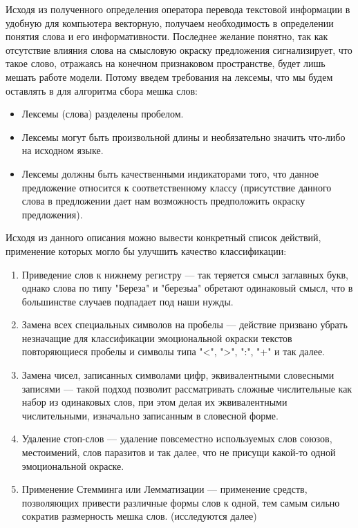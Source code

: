 \documentclass{article}
\begin{document}
    Исходя из полученного определения оператора перевода текстовой информации в удобную для компьютера векторную, получаем необходимость в определении понятия слова и его информативности. Последнее желание понятно, так как отсутствие влияния слова на смысловую окраску предложения сигнализирует, что такое слово, отражаясь на конечном признаковом пространстве, будет лишь мешать работе модели. Потому введем требования на лексемы, что мы будем оставлять в для алгоритма сбора мешка слов:

    \begin{itemize}
        \item Лексемы (слова) разделены пробелом.
        \item Лексемы могут быть произвольной длины и необязательно значить что-либо на исходном языке.
        \item Лексемы должны быть качественными индикаторами того, что данное предложение относится к соответственному классу (присутствие данного слова в предложении дает нам возможность предположить окраску предложения).
    \end{itemize}

    \noindent Исходя из данного описания можно вывести конкретный список действий, применение которых могло бы улучшить качество классификации:

    \begin{enumerate}
        \item Приведение слов к нижнему регистру — так теряется смысл заглавных букв, однако слова по типу "Береза" и "березыа" обретают одинаковый смысл, что в большинстве случаев подпадает под наши нужды.
        \item Замена всех специальных символов на пробелы — действие призвано убрать незначащие для классификации эмоциональной окраски текстов повторяющиеся пробелы и символы типа "<", ">", ":", "+" и так далее.
        \item Замена чисел, записанных символами цифр, эквивалентными словесными записями — такой подход позволит рассматривать сложные числительные как набор из одинаковых слов, при этом делая их эквивалентными числительными, изначально записанным в словесной форме.
        \item Удаление стоп-слов — удаление повсеместно используемых слов союзов, местоимений, слов паразитов и так далее, что не присущи какой-то одной эмоциональной окраске.
        \item Применение Стемминга или Лемматизации — применение средств, позволяющих привести различные формы слов к одной, тем самым сильно сократив размерность мешка слов. (исследуются далее)
    \end{enumerate}
\end{document}
